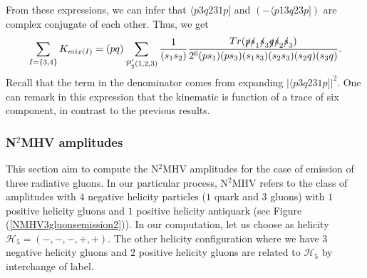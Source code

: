 From these expressions, we can infer that $\langle p3q231p]$ and $(-\langle p13q23p])$ are complex conjugate of each other. Thus, we get
\begin{equation}
\sum_{I=\{3,4\}} K_{mix(I)}=(p q) \sum_{\mathcal{P}^{'}_2(1,2,3)} \frac{1}{(s_1 s_2)} \frac{Tr(\slashed{p} \slashed{s}_1 \slashed{s}_3 \slashed{q} \slashed{s}_2 \slashed{s}_3)}{2^6(ps_1)(ps_3) (s_1s_3)(s_2s_3)(s_2q)(s_3q)}.
\end{equation}
Recall that the term in the denominator comes from expanding $\vert \langle p3q231p]\vert^2$. One can remark in this expression that the kinematic is function of a trace of six component, in contrast to the previous results. 

\subsubsection{N$^2$MHV amplitudes}

This section aim to compute the N$^2$MHV amplitudes for the case of emission of three radiative gluons. In our particular process, N$^2$MHV refers to the class of amplitudes with $4$ negative helicity particles ($1$ quark and $3$ gluons) with $1$ positive helicity gluons and $1$ positive helicity antiquark (see Figure (\ref{NMHV3gluonsemission2})). In our computation, let us choose as helicity $\mathcal{H}_5=(-,-,-,+,+)$. The other helicity configuration where we have $3$ negative helicity gluons and $2$ positive helicity gluons are related to $\mathcal{H}_5$ by interchange of label.

